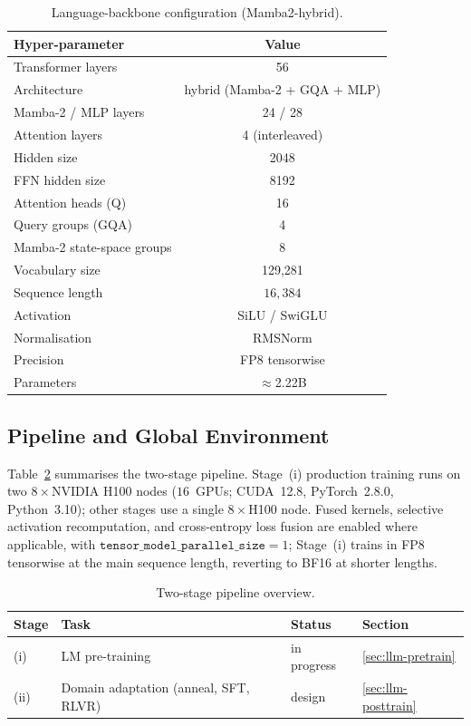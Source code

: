 \begin{table}[t]
\centering
\caption{Language-backbone configuration (Mamba2-hybrid).}
\label{tab:config}
\begin{tabular}{lc}
\toprule
\textbf{Hyper-parameter} & \textbf{Value} \\
\midrule
Transformer layers & 56 \\
Architecture & hybrid (Mamba-2 + GQA + MLP) \\
Mamba-2 / MLP layers & 24 / 28 \\
Attention layers & 4 (interleaved) \\
Hidden size & 2048 \\
FFN hidden size & 8192 \\
Attention heads (Q) & 16 \\
Query groups (GQA) & 4 \\
Mamba-2 state-space groups & 8 \\
Vocabulary size & 129{,}281 \\
Sequence length & $16{,}384$ \\
Activation & SiLU / SwiGLU \\
Normalisation & RMSNorm \\
Precision & FP8 tensorwise \\
Parameters & $\approx$2.22B \\
\bottomrule
\end{tabular}
\end{table}

\subsection{Pipeline and Global Environment}\label{sec:pipeline}
Table~\ref{tab:pipeline} summarises the two-stage pipeline.
Stage~(i) production training runs on two $8\times$NVIDIA H100 nodes ($16$~GPUs; CUDA~12.8, PyTorch~2.8.0, Python~3.10); other stages use a single $8\times$H100 node. Fused kernels, selective activation recomputation, and cross-entropy loss fusion are enabled where applicable, with $\texttt{tensor\_model\_parallel\_size}=1$; Stage~(i) trains in FP8 tensorwise at the main sequence length, reverting to BF16 at shorter lengths.

\begin{table}[t]
\centering
\caption{Two-stage pipeline overview.}
\label{tab:pipeline}
\begin{tabular}{llll}
\toprule
\textbf{Stage} & \textbf{Task} & \textbf{Status} & \textbf{Section} \\
\midrule
(i) & LM pre-training & in progress & \ref{sec:llm-pretrain} \\
(ii) & Domain adaptation (anneal, SFT, RLVR) & design & \ref{sec:llm-posttrain} \\
\bottomrule
\end{tabular}
\end{table}
